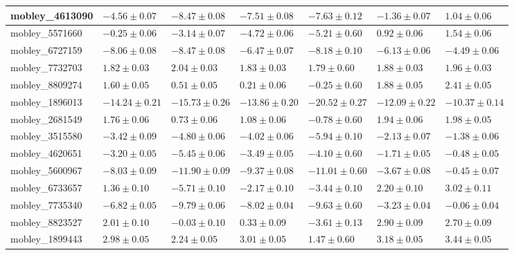 \documentclass{article}
\begin{document}
\begin{landscape}
\begin{longtable}{|l{3.0cm}|l{3.0cm}|l{3.2cm}|l{3.6cm}|l{3.0cm}|l{3.0cm}|l{3.0cm}|}
mobley\_4613090	&	$	-4.56	\pm	0.07	$	&	$	-8.47	\pm	0.08	$	&	$	-7.51	\pm	0.08	$	&	$	-7.63	\pm	0.12	$	&	$	-1.36	\pm	0.07	$	&	$	1.04	\pm	0.06	$	\\ \hline
mobley\_5571660	&	$	-0.25	\pm	0.06	$	&	$	-3.14	\pm	0.07	$	&	$	-4.72	\pm	0.06	$	&	$	-5.21	\pm	0.60	$	&	$	0.92	\pm	0.06	$	&	$	1.54	\pm	0.06	$	\\ \hline
mobley\_6727159	&	$	-8.06	\pm	0.08	$	&	$	-8.47	\pm	0.08	$	&	$	-6.47	\pm	0.07	$	&	$	-8.18	\pm	0.10	$	&	$	-6.13	\pm	0.06	$	&	$	-4.49	\pm	0.06	$	\\ \hline
mobley\_7732703	&	$	1.82	\pm	0.03	$	&	$	2.04	\pm	0.03	$	&	$	1.83	\pm	0.03	$	&	$	1.79	\pm	0.60	$	&	$	1.88	\pm	0.03	$	&	$	1.96	\pm	0.03	$	\\ \hline
mobley\_8809274	&	$	1.60	\pm	0.05	$	&	$	0.51	\pm	0.05	$	&	$	0.21	\pm	0.06	$	&	$	-0.25	\pm	0.60	$	&	$	1.88	\pm	0.05	$	&	$	2.41	\pm	0.05	$	\\ \hline
mobley\_1896013	&	$	-14.24	\pm	0.21	$	&	$	-15.73	\pm	0.26	$	&	$	-13.86	\pm	0.20	$	&	$	-20.52	\pm	0.27	$	&	$	-12.09	\pm	0.22	$	&	$	-10.37	\pm	0.14	$	\\ \hline
mobley\_2681549	&	$	1.76	\pm	0.06	$	&	$	0.73	\pm	0.06	$	&	$	1.08	\pm	0.06	$	&	$	-0.78	\pm	0.60	$	&	$	1.94	\pm	0.06	$	&	$	1.98	\pm	0.05	$	\\ \hline
mobley\_3515580	&	$	-3.42	\pm	0.09	$	&	$	-4.80	\pm	0.06	$	&	$	-4.02	\pm	0.06	$	&	$	-5.94	\pm	0.10	$	&	$	-2.13	\pm	0.07	$	&	$	-1.38	\pm	0.06	$	\\ \hline
mobley\_4620651	&	$	-3.20	\pm	0.05	$	&	$	-5.45	\pm	0.06	$	&	$	-3.49	\pm	0.05	$	&	$	-4.10	\pm	0.60	$	&	$	-1.71	\pm	0.05	$	&	$	-0.48	\pm	0.05	$	\\ \hline
mobley\_5600967	&	$	-8.03	\pm	0.09	$	&	$	-11.90	\pm	0.09	$	&	$	-9.37	\pm	0.08	$	&	$	-11.01	\pm	0.60	$	&	$	-3.67	\pm	0.08	$	&	$	-0.45	\pm	0.07	$	\\ \hline
mobley\_6733657	&	$	1.36	\pm	0.10	$	&	$	-5.71	\pm	0.10	$	&	$	-2.17	\pm	0.10	$	&	$	-3.44	\pm	0.10	$	&	$	2.20	\pm	0.10	$	&	$	3.02	\pm	0.11	$	\\ \hline
mobley\_7735340	&	$	-6.82	\pm	0.05	$	&	$	-9.79	\pm	0.06	$	&	$	-8.02	\pm	0.04	$	&	$	-9.63	\pm	0.60	$	&	$	-3.23	\pm	0.04	$	&	$	-0.06	\pm	0.04	$	\\ \hline
mobley\_8823527	&	$	2.01	\pm	0.10	$	&	$	-0.03	\pm	0.10	$	&	$	0.33	\pm	0.09	$	&	$	-3.61	\pm	0.13	$	&	$	2.90	\pm	0.09	$	&	$	2.70	\pm	0.09	$	\\ \hline
mobley\_1899443	&	$	2.98	\pm	0.05	$	&	$	2.24	\pm	0.05	$	&	$	3.01	\pm	0.05	$	&	$	1.47	\pm	0.60	$	&	$	3.18	\pm	0.05	$	&	$	3.44	\pm	0.05	$	\\ \hline

\end{longtable}
\end{landscape}
\end{document}
